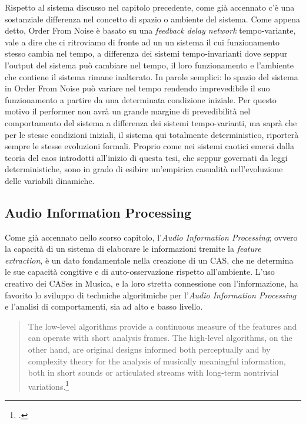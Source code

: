 Rispetto al sistema discusso nel capitolo precedente, 
come già accennato c'è una sostanziale differenza nel concetto di spazio
o ambiente del sistema. 
Come appena detto, Order From Noise è basato su una \textit{feedback delay network} 
tempo-variante, vale a dire che ci ritroviamo di fronte ad un un sistema il cui
funzionamento stesso cambia nel tempo, a differenza dei sistemi tempo-invarianti
dove seppur l'output del sistema può cambiare nel tempo, 
il loro funzionamento e l'ambiente che contiene il sistema rimane inalterato.
In parole semplici: lo spazio del sistema in Order From Noise può variare nel tempo
rendendo imprevedibile il suo funzionamento a partire da una determinata condizione 
iniziale.
Per questo motivo il performer non avrà un grande margine di prevedibilità 
nel comportamento del sistema a differenza dei sistemi tempo-varianti,
ma saprà che per le stesse condizioni iniziali, il sistema qui totalmente
deterministico, riporterà sempre le stesse evoluzioni formali.
Proprio come nei sistemi caotici emersi dalla teoria del caos introdotti all'inizio di questa tesi,
che seppur governati da leggi deterministiche, 
sono in grado di esibire un'empirica casualità nell'evoluzione delle variabili dinamiche. 

\subsection{Audio Information Processing}
\label{sec:Audio Information Processing}
Come già accennato nello scorso capitolo, l'\textit{Audio Information Processing};
ovvero la capacità di un sistema di elaborare le informazioni
tremite la \textit{feature extraction}, è un dato fondamentale nella creazione 
di un CAS, che ne determina le sue capacità congitive e di auto-osservazione
rispetto all'ambiente. 
L'uso creativo dei CASes in Musica,
e la loro stretta connessione con l'informazione,
ha favorito lo sviluppo di techniche algoritmiche per l'\textit{Audio Information Processing} 
e l'analisi di comportamenti, sia ad alto e basso livello.

\begin{quote}
    The low-level algorithms provide a continuous measure of the features and can operate
    with short analysis frames. The high-level algorithms, on the other hand, are original designs informed both perceptually
    and by complexity theory for the analysis of musically meaningful information, both in short sounds or articulated
    streams with long-term nontrivial variations.\footcite{sanfilippo_time-domain_2021}
\end{quote}

